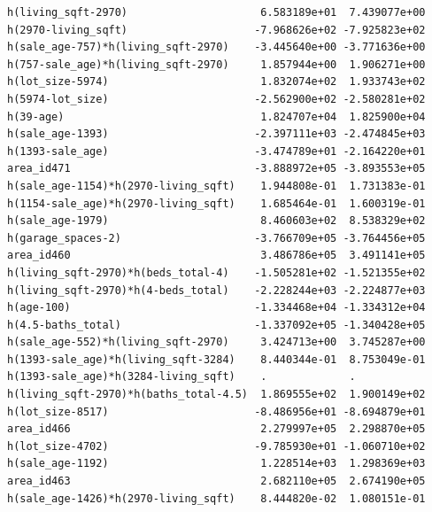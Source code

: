 \documentclass[
]{article}
\begin{document}
\begin{verbatim}
h(living_sqft-2970)                     6.583189e+01  7.439077e+00
h(2970-living_sqft)                    -7.968626e+02 -7.925823e+02
h(sale_age-757)*h(living_sqft-2970)    -3.445640e+00 -3.771636e+00
h(757-sale_age)*h(living_sqft-2970)     1.857944e+00  1.906271e+00
h(lot_size-5974)                        1.832074e+02  1.933743e+02
h(5974-lot_size)                       -2.562900e+02 -2.580281e+02
h(39-age)                               1.824707e+04  1.825900e+04
h(sale_age-1393)                       -2.397111e+03 -2.474845e+03
h(1393-sale_age)                       -3.474789e+01 -2.164220e+01
area_id471                             -3.888972e+05 -3.893553e+05
h(sale_age-1154)*h(2970-living_sqft)    1.944808e-01  1.731383e-01
h(1154-sale_age)*h(2970-living_sqft)    1.685464e-01  1.600319e-01
h(sale_age-1979)                        8.460603e+02  8.538329e+02
h(garage_spaces-2)                     -3.766709e+05 -3.764456e+05
area_id460                              3.486786e+05  3.491141e+05
h(living_sqft-2970)*h(beds_total-4)    -1.505281e+02 -1.521355e+02
h(living_sqft-2970)*h(4-beds_total)    -2.228244e+03 -2.224877e+03
h(age-100)                             -1.334468e+04 -1.334312e+04
h(4.5-baths_total)                     -1.337092e+05 -1.340428e+05
h(sale_age-552)*h(living_sqft-2970)     3.424713e+00  3.745287e+00
h(1393-sale_age)*h(living_sqft-3284)    8.440344e-01  8.753049e-01
h(1393-sale_age)*h(3284-living_sqft)    .             .           
h(living_sqft-2970)*h(baths_total-4.5)  1.869555e+02  1.900149e+02
h(lot_size-8517)                       -8.486956e+01 -8.694879e+01
area_id466                              2.279997e+05  2.298870e+05
h(lot_size-4702)                       -9.785930e+01 -1.060710e+02
h(sale_age-1192)                        1.228514e+03  1.298369e+03
area_id463                              2.682110e+05  2.674190e+05
h(sale_age-1426)*h(2970-living_sqft)    8.444820e-02  1.080151e-01
                                                                  

\end{verbatim}
\end{document}
